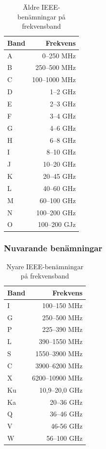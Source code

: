 \begin{table}[H]
	\centering
	\begin{tabular}{lr}
		\textbf{Band} & \textbf{Frekvens} \\ \hline
		A             &        0--250 MHz \\
		B             &      250--500 MHz \\
		C             &     100--1000 MHz \\
		D             &          1--2 GHz \\
		E             &          2--3 GHz \\
		F             &          3--4 GHz \\
		G             &          4--6 GHz \\
		H             &          6--8 GHz \\
		I             &         8--10 GHz \\
		J             &        10--20 GHz \\
		K             &        20--45 GHz \\
		L             &        40--60 GHz \\
		M             &       60--100 GHz \\
		N             &      100--200 GHz \\
		O             &      100--200 GJz
	\end{tabular}
	\caption{Äldre IEEE-benämningar på frekvensband}
\end{table}

\subsubsection{Nuvarande benämningar}

\begin{table}[H]
	\centering
	\begin{tabular}{lr}
		\textbf{Band} & \textbf{Frekvens} \\ \hline
		I             &      100--150 MHz \\
		G             &      250--500 MHz \\
		P             &      225--390 MHz \\
		L             &     390--1550 MHz \\
		S             &    1550--3900 MHz \\
		C             &    3900--6200 MHz \\
		X             &   6200--10900 MHz \\
		Ku            &    10,9--20,0 GHz \\
		Ka            &        20--36 GHz \\
		Q             &        36--46 GHz \\
		V             &         46-56 GHz \\
		W             &       56--100 GHz
	\end{tabular}
	\caption{Nyare IEEE-benämningar på frekvensband}
\end{table}

